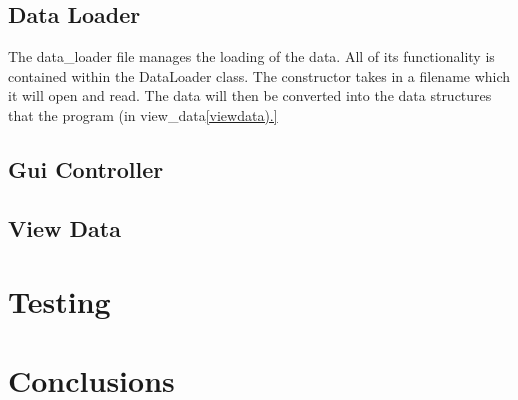\documentclass[11pt]{report}
\begin{document}
\section{Data Loader}
The data\_loader file manages the loading of the data.  All of its functionality is contained within the DataLoader class.  The constructor takes in a filename which it will open and read.  The data will then be converted into the data structures that the program (in view_data\ref{viewdata).}
\section{Gui Controller}
\section{View Data}\label{viewdata}

\chapter{Testing}

\chapter{Conclusions}



\end{document}
